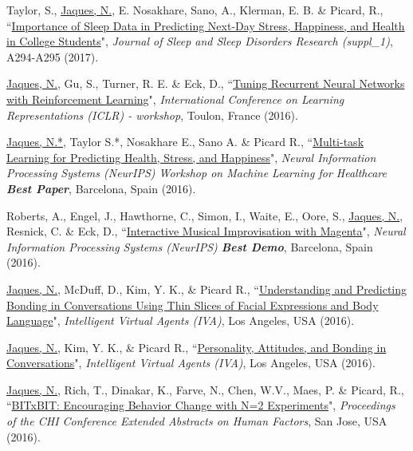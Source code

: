 \documentclass[paper=letter,fontsize=11pt]{scrartcl} %
\newcommand{\PaperEntry}[6]{
		\noindent #1, ``\href{#6}{#2}", \textit{#3}, #4 (#5).}
\begin{document}
\begin{etaremune}
\item \PaperEntry{Taylor, S., \underline{Jaques, N.}, E. Nosakhare, Sano, A., Klerman, E. B. \& Picard, R.}{Importance of Sleep Data in Predicting Next-Day Stress, Happiness, and Health in College Students}{Journal of Sleep and Sleep Disorders Research (suppl\_1)}{A294-A295}{2017}{https://affect.media.mit.edu/pdfs/17.Taylor-etal-MoodPrediction-SLEEP2017-Poster.pdf}

\item \PaperEntry{\underline{Jaques, N.}, Gu, S., Turner, R. E. \& Eck, D.}{Tuning Recurrent Neural Networks with Reinforcement Learning}{International Conference on Learning Representations (ICLR) - workshop}{Toulon, France}{2016}{https://openreview.net/pdf?id=Syyv2e-Kx}

\item \PaperEntry{\underline{Jaques, N.*}, Taylor S.*, Nosakhare E., Sano A. \& Picard R.}{Multi-task Learning for Predicting Health, Stress, and Happiness}{Neural Information Processing Systems (NeurIPS) Workshop on Machine Learning for Healthcare \textbf{Best Paper}}{Barcelona, Spain}{2016}{https://pdfs.semanticscholar.org/b228/7a406985980515d5cc63e9b37fb17c5186f8.pdf}

\item \PaperEntry{Roberts, A., Engel, J., Hawthorne, C., Simon, I., Waite, E., Oore, S., \underline{Jaques, N.}, Resnick, C. \& Eck, D.}{Interactive Musical Improvisation with Magenta}{Neural Information Processing Systems (NeurIPS) \textbf{Best Demo}}{Barcelona, Spain}{2016}{https://nips.cc/Conferences/2016/Schedule?showEvent=6307}

\item \PaperEntry{\underline{Jaques, N.}, McDuff, D., Kim, Y. K., \& Picard R.}{Understanding and Predicting Bonding in Conversations Using Thin Slices of Facial Expressions and Body Language}{Intelligent Virtual Agents (IVA)}{Los Angeles, USA}{2016}{http://affect.media.mit.edu/pdfs/16.Jaques-IVAbonding.pdf}

\item \PaperEntry{\underline{Jaques, N.}, Kim, Y. K., \& Picard R.}{Personality, Attitudes, and Bonding in Conversations}{Intelligent Virtual Agents (IVA)}{Los Angeles, USA}{2016}{http://affect.media.mit.edu/pdfs/16.Jaques-IVApersonality.pdf}

\item \PaperEntry{\underline{Jaques, N.}, Rich, T., Dinakar, K., Farve, N., Chen, W.V., Maes, P. \& Picard, R.}{BITxBIT: Encouraging Behavior Change with N=2 Experiments}{Proceedings of the CHI Conference Extended Abstracts on Human Factors}{San Jose, USA}{2016}{http://affect.media.mit.edu/pdfs/16.Jaques-etal-CHI.pdf}


\end{etaremune}
\end{document}
